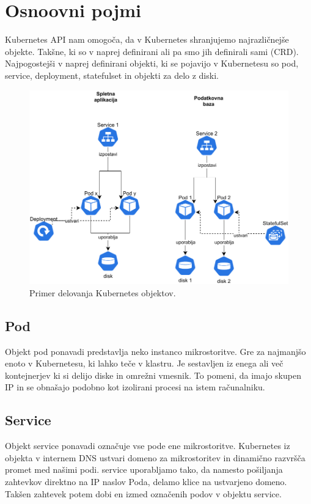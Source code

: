 \documentclass[a4paper, 12pt]{book}
\begin{document}
\section{Osnoovni pojmi}
Kubernetes API nam omogoča, da v Kubernetes shranjujemo najrazličnejše objekte.
Takšne, ki so v naprej definirani ali pa smo jih definirali sami (CRD).
Najpogostejši v naprej definirani objekti, ki se pojavijo v Kubernetesu so pod, service, deployment, statefulset in objekti za delo z diski.
\begin{figure}[h]
\begin{center}
\includegraphics[width=1.0\textwidth]{images/Kubernetes-simple-schema.pdf}
\end{center}
\caption{Primer delovanja Kubernetes objektov.}
\label{problem-povezanih-klastrov}
\end{figure}
\subsection{Pod~\cite{pod}}
Objekt pod ponavadi predstavlja neko instanco mikrostoritve.
Gre za najmanjšo enoto v Kubernetesu, ki lahko teče v klastru.
Je sestavljen iz enega ali več kontejnerjev ki si delijo diske in omrežni vmesnik.
To pomeni, da imajo skupen IP in se obnašajo podobno kot izolirani procesi na istem računalniku.
\subsection{Service~\cite{service}}
Objekt service ponavadi označuje vse pode ene mikrostoritve.
Kubernetes iz objekta v internem DNS ustvari domeno za mikrostoritev in dinamično razvršča promet med našimi podi.
service uporabljamo tako, da namesto pošiljanja zahtevkov direktno na IP naslov Poda, delamo klice na ustvarjeno domeno.
Takšen zahtevek potem dobi en izmed označenih podov v objektu service.
\end{document}
